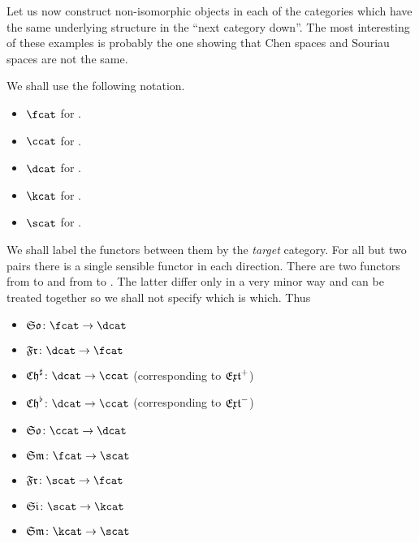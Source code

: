 \documentclass[%
a4paper,%
arxiv,%
defaults
]{myclass}
\begin{document}
\medskip

Let us now construct non\hyp{}isomorphic objects in each of the categories which have the same underlying structure in the ``next category down''.
The most interesting of these examples is probably the one showing that Chen spaces and Souriau spaces are not the same.

We shall use the following notation.
%
\begin{itemize}
\item \(\fcat\) for \fcat.
\item \(\ccat\) for \ccat.
\item \(\dcat\) for \dcat.
\item \(\kcat\) for \kcat.
\item \(\scat\) for \scat.
\end{itemize}
%
We shall label the functors between them by the \emph{target} category.
For all but two pairs there is a single sensible functor in each direction.
There are two functors from \dcat to \ccat and from \fcat to \scat.
The latter differ only in a very minor way and can be treated together so we shall not specify which is which.
Thus
%
\begin{itemize}
\item \(\FrSo\colon \fcat \to \dcat\)
\item \(\SoFr\colon \dcat \to \fcat\)
\item \(\SoCht\colon \dcat \to \ccat\) (corresponding to \(\Jextfunc\))
\item \(\SoChb\colon \dcat \to \ccat\) (corresponding to \(\Mextfunc\))
\item \(\ChSo\colon \ccat \to \dcat\)
\item \(\FrSm\colon \fcat \to \scat\)
\item \(\SmFr\colon \scat \to \fcat\)
\item \(\SmSi\colon \scat \to \kcat\)
\item \(\SiSm\colon \kcat \to \scat\)
\end{itemize}
\end{document}
